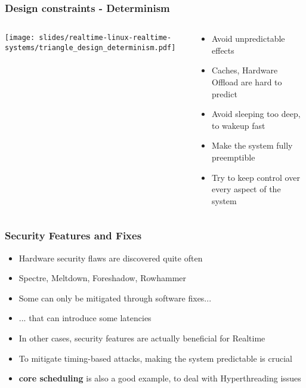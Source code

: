 \begin{frame}
        \frametitle{Design constraints - Determinism}
        \begin{columns}
        \begin{column}{0.35\textwidth}
        \texttt{[image: slides/realtime-linux-realtime-systems/triangle\_design\_determinism.pdf]}
        \end{column}
                \begin{column}{0.65\textwidth}
                        \begin{itemize}
                                \item Avoid unpredictable effects
                                \item Caches, Hardware Offload are hard to predict
                                \item Avoid sleeping too deep, to wakeup fast
                                \item Make the system fully preemptible
                                \item Try to keep control over every aspect of the system
                        \end{itemize}
                \end{column}
        \end{columns}
\end{frame}

\begin{frame}
        \frametitle{Security Features and Fixes}
        \begin{itemize}
                \item Hardware security flaws are discovered quite often
                \item Spectre, Meltdown, Foreshadow, Rowhammer
                \item Some can only be mitigated through software fixes...
                \item ... that can introduce some latencies
                \item In other cases, security features are actually beneficial for Realtime
                \item To mitigate timing-based attacks, making the system predictable is crucial
                \item \textbf{core scheduling} is also a good example, to deal with Hyperthreading issues
        \end{itemize}
\end{frame}


